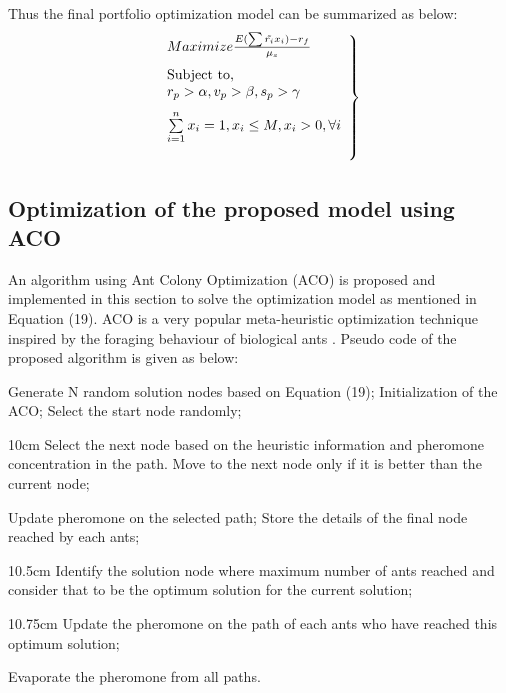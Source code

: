 \documentclass{ws-ijufks}
\begin{document}
Thus the final portfolio optimization model can be summarized as below:
\begin{equation}
\begin{aligned}
\left. \begin{array}{ll}
\vspace{0.25cm}
Maximize \frac{E(\sum \tilde{r_i}x_i)-r_f}{\mu_s}\\
\text{Subject to, }\\
\vspace{0.25cm}
r_p>\alpha, v_p>\beta, s_p>\gamma\\
\vspace{0.5cm}
\sum\limits_{i=1}^{n}x_i=1, x_i\leq M, x_i>0, \forall i
\end{array}\right\}
\end {aligned}
\end{equation}

\subsection{Optimization of the proposed model using ACO}
An algorithm using Ant Colony Optimization (ACO) is proposed and implemented in this section to solve the optimization 
model as mentioned in Equation (19). ACO is a very popular meta-heuristic optimization technique inspired by the 
foraging behaviour of biological ants \cite{Dorigo2006,Deneubourg1990}. Pseudo code of the proposed algorithm is given 
as below:

\begin{algorithm}
	\caption{ACO algorithm for portfolio optimization}
	\label{ACOportfolio}
	\begin{algorithmic}[1]
		\State Generate N random solution nodes based on Equation (19);
		\State Initialization of the ACO;
		\State Select the start node randomly;
		\State \begin{varwidth}[t]{10cm}
			Select the next node based on the heuristic information and pheromone concentration in the path. Move to 
			the next node only if it is better than the current node;\\
		\end{varwidth}
		\State Update pheromone on the selected path;
		\EndFor
		\State Store the details of the final node reached by each ants;
		\EndFor
		\State 
		\begin{varwidth}[t]{10.5cm}
			Identify the solution node where maximum number of ants reached and consider that to be the optimum 
			solution for the current solution;\\
		\end{varwidth} 
		
		\State 
		\begin{varwidth}[t]{10.75cm}
			Update the pheromone on the path of each ants who have reached this optimum solution;\\
		\end{varwidth}
		\State Evaporate the pheromone from all paths.
		\EndFor
		
		\EndProcedure
	\end{algorithmic}
\end{algorithm}
\end{document}
